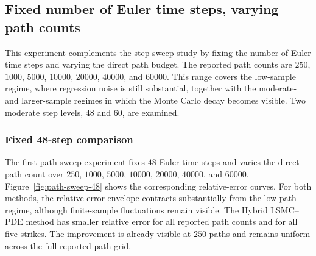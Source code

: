 \documentclass[pdflatex,sn-mathphys-num]{sn-jnl}
\theoremstyle{thmstyleone}%
\theoremstyle{thmstylethree}%
\theoremstyle{thmstyletwo}%
\begin{document}
\subsection{Fixed number of Euler time steps, varying path counts}

This experiment complements the step-sweep study by fixing the number of Euler time steps and varying the direct path budget. The reported path counts are \(250\), \(1000\), \(5000\), \(10000\), \(20000\), \(40000\), and \(60000\). This range covers the low-sample regime, where regression noise is still substantial, together with the moderate- and larger-sample regimes in which the Monte Carlo decay becomes visible. Two moderate step levels, \(48\) and \(60\), are examined.

\subsubsection*{Fixed 48-step comparison}
The first path-sweep experiment fixes \(48\) Euler time steps and varies the direct path count over \(250\), \(1000\), \(5000\), \(10000\), \(20000\), \(40000\), and \(60000\). Figure~\ref{fig:path-sweep-48} shows the corresponding relative-error curves. For both methods, the relative-error envelope contracts substantially from the low-path regime, although finite-sample fluctuations remain visible. The Hybrid LSMC--PDE method has smaller relative error for all reported path counts and for all five strikes. The improvement is already visible at \(250\) paths and remains uniform across the full reported path grid.
\end{document}
